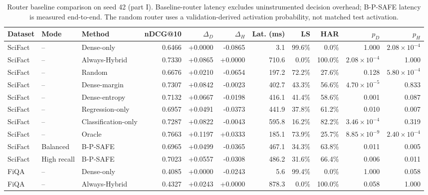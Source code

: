 \begin{table}[!htbp]
\centering
\caption{Router baseline comparison on seed 42 (part I). Baseline-router latency excludes uninstrumented decision overhead; B-P-SAFE latency is measured end-to-end. The random router uses a validation-derived activation probability, not matched test activation.}
\label{tab:router_baselines_a}
\scriptsize
\setlength{\tabcolsep}{2.2pt}
\begin{tabular}{lllrrrrrrrr}
\toprule
Dataset & Mode & Method & nDCG@10 & $\Delta_D$ & $\Delta_H$ & Lat. (ms) & LS & HAR & $p_D$ & $p_H$ \\
\midrule
SciFact & -- & Dense-only & 0.6466 & +0.0000 & -0.0865 & 3.1 & 99.6\% & 0.0\% & 1.000 & $2.08\!\times\!10^{-4}$ \\
SciFact & -- & Always-Hybrid & 0.7330 & +0.0865 & +0.0000 & 710.6 & 0.0\% & 100.0\% & $2.08\!\times\!10^{-4}$ & 1.000 \\
SciFact & -- & Random & 0.6676 & +0.0210 & -0.0654 & 197.2 & 72.2\% & 27.6\% & 0.128 & $5.80\!\times\!10^{-4}$ \\
SciFact & -- & Dense-margin & 0.7307 & +0.0842 & -0.0023 & 402.7 & 43.3\% & 56.6\% & $4.70\!\times\!10^{-5}$ & 0.833 \\
SciFact & -- & Dense-entropy & 0.7132 & +0.0667 & -0.0198 & 416.1 & 41.4\% & 58.6\% & 0.001 & 0.087 \\
SciFact & -- & Regression-only & 0.6957 & +0.0491 & -0.0373 & 441.9 & 37.8\% & 61.2\% & 0.010 & 0.007 \\
SciFact & -- & Classification-only & 0.7287 & +0.0822 & -0.0043 & 595.8 & 16.2\% & 82.2\% & $3.46\!\times\!10^{-4}$ & 0.319 \\
SciFact & -- & Oracle & 0.7663 & +0.1197 & +0.0333 & 185.1 & 73.9\% & 25.7\% & $8.85\!\times\!10^{-9}$ & $2.40\!\times\!10^{-4}$ \\
SciFact & Balanced & B-P-SAFE & 0.6965 & +0.0499 & -0.0365 & 467.1 & 34.3\% & 63.8\% & 0.011 & 0.005 \\
SciFact & High recall & B-P-SAFE & 0.7023 & +0.0557 & -0.0308 & 486.2 & 31.6\% & 66.4\% & 0.006 & 0.011 \\
\midrule
FiQA & -- & Dense-only & 0.4085 & +0.0000 & -0.0243 & 5.6 & 99.4\% & 0.0\% & 1.000 & 0.058 \\
FiQA & -- & Always-Hybrid & 0.4327 & +0.0243 & +0.0000 & 878.3 & 0.0\% & 100.0\% & 0.058 & 1.000 \\

\end{tabular}
\end{table}
